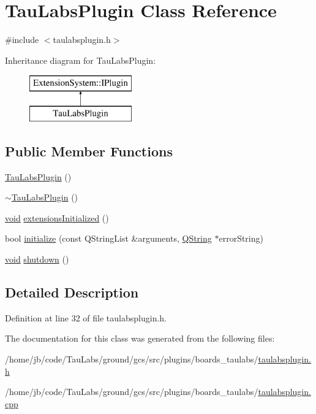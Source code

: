 \hypertarget{class_tau_labs_plugin}{\section{\-Tau\-Labs\-Plugin \-Class \-Reference}
\label{class_tau_labs_plugin}
}


{\ttfamily \#include $<$taulabsplugin.\-h$>$}

\-Inheritance diagram for \-Tau\-Labs\-Plugin\-:\begin{figure}[H]
\begin{center}
\leavevmode
\includegraphics[height=2.000000cm]{class_tau_labs_plugin}
\end{center}
\end{figure}
\subsection*{\-Public \-Member \-Functions}
\begin{DoxyCompactItemize}
\item 
\hyperlink{group___boards___tau_labs_plugin_gaee528ef25fec71f73309b849859399e9}{\-Tau\-Labs\-Plugin} ()
\item 
\hyperlink{group___boards___tau_labs_plugin_ga861e4dbacf34fb519437082e3f859655}{$\sim$\-Tau\-Labs\-Plugin} ()
\item 
\hyperlink{group___u_a_v_objects_plugin_ga444cf2ff3f0ecbe028adce838d373f5c}{void} \hyperlink{group___boards___tau_labs_plugin_gae657bb027ed736aeb4e371bdb9a6bff7}{extensions\-Initialized} ()
\item 
bool \hyperlink{group___boards___tau_labs_plugin_ga1f025f9260a3a6745cbe0d35f3ecd563}{initialize} (const \-Q\-String\-List \&arguments, \hyperlink{group___u_a_v_objects_plugin_gab9d252f49c333c94a72f97ce3105a32d}{\-Q\-String} $\ast$error\-String)
\item 
\hyperlink{group___u_a_v_objects_plugin_ga444cf2ff3f0ecbe028adce838d373f5c}{void} \hyperlink{group___boards___tau_labs_plugin_ga7c69e7ef31a4c5b510b1aa88de11dda9}{shutdown} ()
\end{DoxyCompactItemize}


\subsection{\-Detailed \-Description}


\-Definition at line 32 of file taulabsplugin.\-h.



\-The documentation for this class was generated from the following files\-:\begin{DoxyCompactItemize}
\item 
/home/jb/code/\-Tau\-Labs/ground/gcs/src/plugins/boards\-\_\-taulabs/\hyperlink{taulabsplugin_8h}{taulabsplugin.\-h}\item 
/home/jb/code/\-Tau\-Labs/ground/gcs/src/plugins/boards\-\_\-taulabs/\hyperlink{taulabsplugin_8cpp}{taulabsplugin.\-cpp}\end{DoxyCompactItemize}
